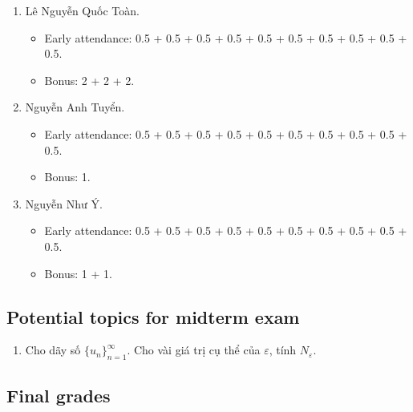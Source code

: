 \documentclass{article}
\begin{document}
\begin{enumerate}
\begin{itemize}
	\end{itemize}
	\item {\sc Lê Nguyễn Quốc Toàn.}
	\begin{itemize}
		\item Early attendance: 0.5 + 0.5 + 0.5 + 0.5 + 0.5 + 0.5 + 0.5 + 0.5 + 0.5 + 0.5.
		\item Bonus: 2 + 2 + 2.
	\end{itemize}
	\item {\sc Nguyễn Anh Tuyển.}
	\begin{itemize}
		\item Early attendance: 0.5 + 0.5 + 0.5 + 0.5 + 0.5 + 0.5 + 0.5 + 0.5 + 0.5 + 0.5.
		\item Bonus: 1.
	\end{itemize}
	\item {\sc Nguyễn Như Ý.}
	\begin{itemize}
		\item Early attendance: 0.5 + 0.5 + 0.5 + 0.5 + 0.5 + 0.5 + 0.5 + 0.5 + 0.5 + 0.5.
		\item Bonus: 1 + 1.
	\end{itemize}
\end{enumerate}


\subsection{Potential topics for midterm exam}

\begin{enumerate}
	\item Cho dãy số $\{u_n\}_{n=1}^\infty$. Cho vài giá trị cụ thể của $\varepsilon$, tính $N_\varepsilon$.
\end{enumerate}


\subsection{Final grades}
\end{document}
